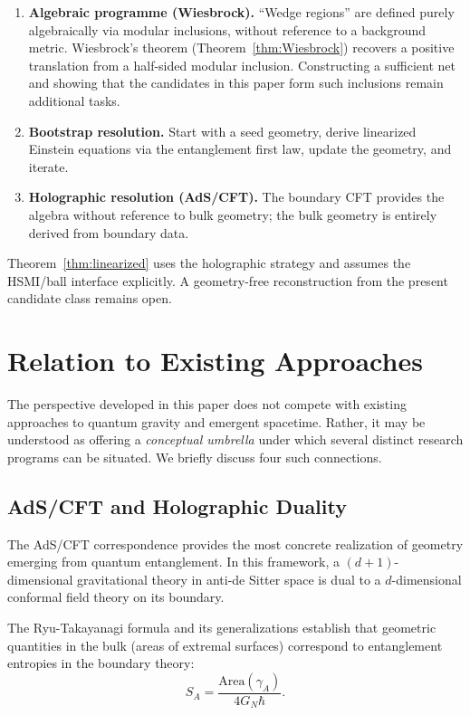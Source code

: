 \documentclass[12pt,a4paper]{article}
\begin{document}
\begin{enumerate}
\item[(A)] \textbf{Algebraic programme (Wiesbrock).}
``Wedge regions'' are defined purely algebraically via modular inclusions, without reference to a background metric.
Wiesbrock's theorem (Theorem~\ref{thm:Wiesbrock}) recovers a positive translation from a half-sided modular inclusion.  Constructing a sufficient net and showing that the candidates in this paper form such inclusions remain additional tasks.

\item[(B)] \textbf{Bootstrap resolution.}
Start with a seed geometry, derive linearized Einstein equations via the entanglement first law, update the geometry, and iterate.

\item[(C)] \textbf{Holographic resolution (AdS/CFT).}
The boundary CFT provides the algebra without reference to bulk geometry; the bulk geometry is entirely derived from boundary data.
\end{enumerate}

Theorem~\ref{thm:linearized} uses the holographic strategy and assumes the HSMI/ball interface explicitly.  A geometry-free reconstruction from the present candidate class remains open.


\section{Relation to Existing Approaches}
\label{sec:relation}

The perspective developed in this paper does not compete with existing approaches to quantum gravity and emergent spacetime. Rather, it may be understood as offering a \emph{conceptual umbrella} under which several distinct research programs can be situated. We briefly discuss four such connections.

\subsection{AdS/CFT and Holographic Duality}

The AdS/CFT correspondence \cite{Maldacena1999} provides the most concrete realization of geometry emerging from quantum entanglement. In this framework, a $(d+1)$-dimensional gravitational theory in anti-de Sitter space is dual to a $d$-dimensional conformal field theory on its boundary.

The Ryu-Takayanagi formula \cite{RyuTakayanagi2006} and its generalizations establish that geometric quantities in the bulk (areas of extremal surfaces) correspond to entanglement entropies in the boundary theory:
\begin{equation}
S_A = \frac{\text{Area}(\gamma_A)}{4 G_N \hbar}.
\end{equation}
\end{document}
